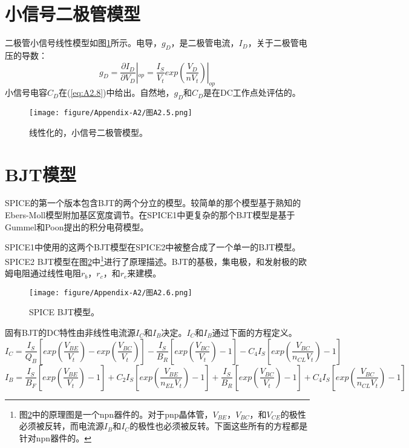 \section{小信号二极管模型}
二极管小信号线性模型如图\ref{图A2.5}所示。电导，$g_D$，是二极管电流，$I_D$，关于二极管电压的导数：
\begin{equation}
    g_D = \frac{\partial I_D}{\partial V_D}|_{op} = \frac{I_S}{V_t}exp(\frac{V_D}{nV_t})|_{op}
    \label{eq:A2.9}
\end{equation}
小信号电容$C_D$在(\ref{eq:A2.8})中给出。自然地，$g_D$和$C_D$是在DC工作点处评估的。
\begin{figure}[htbp]
\small
    \centering
    \texttt{[image: figure/Appendix-A2/图A2.5.png]}
    \caption{线性化的，小信号二极管模型。}
    \label{图A2.5}
\end{figure}

\section{BJT模型}
SPICE的第一个版本包含BJT\cite{ref-1}的两个分立的模型。较简单的那个模型基于熟知的Ebers-Moll模型\cite{ref-78}附加基区宽度调节\cite{ref-79}。在SPICE1中更复杂的那个BJT模型是基于Gummel和Poon\cite{ref-80,ref-81,ref-82}提出的积分电荷模型。

SPICE1中使用的这两个BJT模型在SPICE2中被整合成了一个单一的BJT模型。SPICE2 BJT模型在图\ref{图A2.6}中\footnote{图\ref{图A2.6}中的原理图是一个npn器件的。对于pnp晶体管，$V_{BE}$，$V_{BC}$，和$V_{CE}$的极性必须被反转，而电流源$I_B$和$I_C$的极性也必须被反转。下面这些所有的方程都是针对npn器件的。}进行了原理描述。BJT的基极，集电极，和发射极的欧姆电阻通过线性电阻$r_b$，$r_c$，和$r_e$来建模。
\begin{figure}[htbp]
\small
    \centering
    \texttt{[image: figure/Appendix-A2/图A2.6.png]}
    \caption{SPICE BJT模型。}
    \label{图A2.6}
\end{figure}

固有BJT的DC特性由非线性电流源$I_C$和$I_B$决定。$I_C$和$I_B$通过下面的方程定义。
\begin{equation}
    I_C = \frac{I_S}{Q_B}[exp(\frac{V_{BE}}{V_t}) - exp(\frac{V_{BC}}{V_t})] - \frac{I_S}{B_R}[exp(\frac{V_{BC}}{V_t})-1] - C_4I_S[exp(\frac{V_{BC}}{n_{CL}V_t})-1]
    \label{eq:A2.10}
\end{equation}
\begin{equation}
    I_B = \frac{I_S}{B_F}[exp(\frac{V_{BE}}{V_t})-1] + C_2I_S[exp(\frac{V_{BE}}{n_{EL}V_t})-1] + \frac{I_S}{B_R}[exp(\frac{V_{BC}}{V_t})-1] + C_4I_S[exp(\frac{V_{BC}}{n_{CL}V_t})-1]
    \label{eq:A2.11}
\end{equation}

